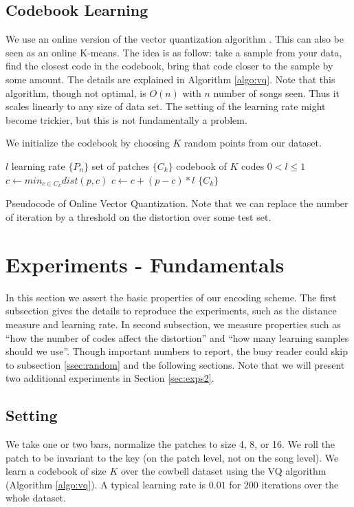 \documentclass{article}
\begin{document}
\subsection{Codebook Learning}
We use an online version of the vector quantization algorithm 
\cite{Gersho1991}. This can also be seen as an online K-means.
The idea is as follow: take a sample from your data, find the closest
code in the codebook, bring that code closer to the sample by some amount.
The details are explained in Algorithm \ref{algo:vq}. Note that this
algorithm, though not optimal, is $O(n)$ with $n$ number of songs seen.
Thus it scales linearly to any size of data set. The setting of the learning
rate might become trickier, but this is not fundamentally a problem.

We initialize the codebook by choosing $K$ random points from our dataset.


\begin{algorithm}
\begin{algorithmic}
\STATE$l$ learning rate
\STATE$\{P_n\}$ set of patches
\STATE$\{C_k\}$ codebook of $K$ codes
\REQUIRE $0 < l \leq 1$
\STATE$c \leftarrow min_{c \in C_k} dist(p,c)$
\STATE$c \leftarrow c + (p - c) * l$
\ENDFOR
\ENDFOR
\RETURN $\{C_k\}$
\caption{\small{Pseudocode of Online Vector Quantization. Note that we can 
replace the number of iteration by a threshold on the distortion over some 
test set.}
\label{algo:vq}}
\end{algorithmic}
\end{algorithm}



\section{Experiments - Fundamentals}\label{sec:experiments}
In this section we assert the basic properties of our encoding scheme.
The first subsection gives the details to reproduce the experiments,
such as the distance measure and learning rate. In second subsection, we
measure properties such as ``how the number of codes affect the distortion''
and ``how many learning samples should we use''. Though important numbers
to report, the busy reader could skip to subsection \ref{ssec:random}
and the following sections.
Note that we will present two additional experiments in 
Section \ref{sec:exps2}.


\subsection{Setting}\label{ssec:setting}
We take one or two bars, normalize the patches to size 4, 8, or 16.
We roll the patch to be invariant to the key (on the patch level, not on
the song level). We learn a codebook of size $K$ over the cowbell dataset 
using the VQ algorithm (Algorithm \ref{algo:vq}). A typical learning rate 
is $0.01$ for $200$ iterations over the whole dataset.
\end{document}
